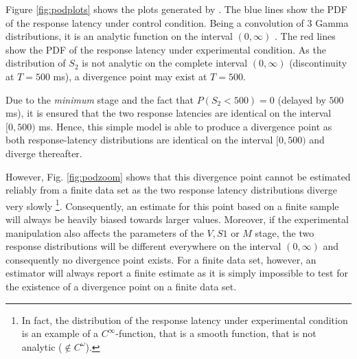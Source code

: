 Figure \ref{fig:podplots} shows the plots generated by . The blue lines show the PDF
of the response latency under control condition. Being a convolution of 3 Gamma distributions, it 
is an analytic function on the interval $(0,\infty)$ \citep{Gelooven1999}. The red lines show the 
PDF of the response latency under experimental condition. As the distribution of $S_2$ is not analytic on 
the complete interval $(0,\infty)$ (discontinuity at $T=500$ ms), a divergence point may exist at 
$T=500$. 

Due to the \emph{minimum} stage and the fact that $P(S_2<500)=0$ (delayed by 
$500$ ms), it is ensured that the two response latencies are identical on the interval $[0,500)$ ms.
Hence, this simple model is able to produce a divergence point as both response-latency distributions are identical
on the interval $[0,500)$ and diverge thereafter.

However, Fig. \ref{fig:podzoom} shows that this divergence point cannot be estimated reliably from
a finite data set as the two response latency distributions diverge very slowly%
\footnote{In fact, the distribution of the response latency under experimental condition is an
example of a $C^\infty$-function, that is a smooth function, that is not analytic
($\notin C^\omega$).}. Consequently, an estimate for this point \cite[e.g. by means of estimators 
proposed in][]{Reingold2012} based on a finite sample will always be heavily biased towards larger
values. Moreover, if the experimental manipulation also affects the parameters of the $V, S1$ or 
$M$ stage, the two response distributions will be different everywhere on the interval
$(0,\infty)$ and consequently no divergence point exists. For a finite data set, however, an
estimator \cite[like][]{Reingold2012} will always report a finite estimate as it is simply impossible
to test for the existence of a divergence point on a finite data set. 